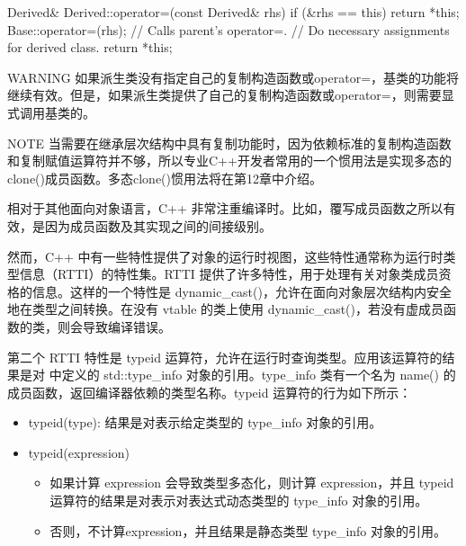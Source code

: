 \begin{cpp}
Derived& Derived::operator=(const Derived& rhs)
{
    if (&rhs == this) { return *this; }
    Base::operator=(rhs); // Calls parent's operator=.
    // Do necessary assignments for derived class.
    return *this;
}
\end{cpp}

\begin{myWarning}{WARNING}
如果派生类没有指定自己的复制构造函数或operator=，基类的功能将继续有效。但是，如果派生类提供了自己的复制构造函数或operator=，则需要显式调用基类的。
\end{myWarning}


\begin{myNotic}{NOTE}
当需要在继承层次结构中具有复制功能时，因为依赖标准的复制构造函数和复制赋值运算符并不够，所以专业C++开发者常用的一个惯用法是实现多态的clone()成员函数。多态clone()惯用法将在第12章中介绍。
\end{myNotic}


相对于其他面向对象语言，C++ 非常注重编译时。比如，覆写成员函数之所以有效，是因为成员函数及其实现之间的间接级别。

然而，C++ 中有一些特性提供了对象的运行时视图，这些特性通常称为运行时类型信息（RTTI）的特性集。RTTI 提供了许多特性，用于处理有关对象类成员资格的信息。这样的一个特性是 dynamic\_cast()，允许在面向对象层次结构内安全地在类型之间转换。在没有 vtable 的类上使用 dynamic\_cast()，若没有虚成员函数的类，则会导致编译错误。

第二个 RTTI 特性是 typeid 运算符，允许在运行时查询类型。应用该运算符的结果是对 中定义的 std::type\_info 对象的引用。type\_info 类有一个名为 name() 的成员函数，返回编译器依赖的类型名称。typeid 运算符的行为如下所示：

\begin{itemize}
\item
typeid(type): 结果是对表示给定类型的 type\_info 对象的引用。

\item
typeid(expression)
\begin{itemize}
\item
如果计算 expression 会导致类型多态化，则计算 expression，并且 typeid 运算符的结果是对表示对表达式动态类型的 type\_info 对象的引用。

\item
否则，不计算expression，并且结果是静态类型 type\_info 对象的引用。
\end{itemize}
\end{itemize}

